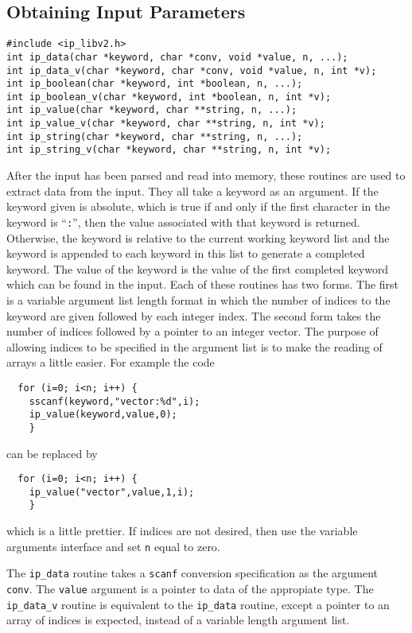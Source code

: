 \subsection{Obtaining Input Parameters}
\begin{verbatim}
#include <ip_libv2.h>
int ip_data(char *keyword, char *conv, void *value, n, ...);
int ip_data_v(char *keyword, char *conv, void *value, n, int *v);
int ip_boolean(char *keyword, int *boolean, n, ...);
int ip_boolean_v(char *keyword, int *boolean, n, int *v);
int ip_value(char *keyword, char **string, n, ...);
int ip_value_v(char *keyword, char **string, n, int *v);
int ip_string(char *keyword, char **string, n, ...);
int ip_string_v(char *keyword, char **string, n, int *v);
\end{verbatim}
After the input has been parsed and read into memory, these routines
are used to extract data from the input.  They all take a keyword as
an argument.  If the keyword given is absolute, which is true if and
only if the first character in the keyword is ``\verb|:|'', then
the value associated with that keyword is returned.  Otherwise, the
keyword is relative to the current working keyword list and the
keyword is appended to each keyword in this list to generate a completed
keyword.  The value of the keyword is the value of the first completed
keyword which can be found in the input.  Each of these routines has
two forms.  The first is a variable argument list length format in which
the number of indices to the keyword are given followed by each integer
index.  The second form takes the number of indices followed by a pointer
to an integer vector.  The purpose of allowing indices to be specified
in the argument list is to make the reading of arrays a little easier.
For example the code
\begin{verbatim}
  for (i=0; i<n; i++) {
    sscanf(keyword,"vector:%d",i);
    ip_value(keyword,value,0);
    }
\end{verbatim}
can be replaced by
\begin{verbatim}
  for (i=0; i<n; i++) {
    ip_value("vector",value,1,i);
    }
\end{verbatim}
which is a little prettier.  If indices are not desired, then use
the variable arguments interface and set \verb|n| equal to zero.

The \verb|ip_data| routine takes a \verb|scanf| conversion specification
as the argument \verb|conv|.  The \verb|value| argument is a pointer to
data of the appropiate type.  The \verb|ip_data_v| routine is equivalent
to the \verb|ip_data| routine, except a pointer to an array of indices
is expected, instead of a variable length argument list.

